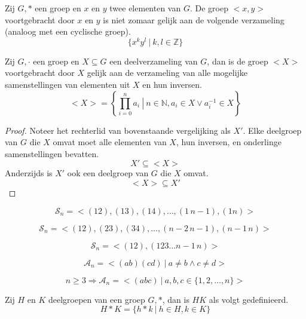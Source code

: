 \documentclass[main.tex]{subfiles}
\begin{document}
\begin{opm}
  Zij $G,*$ een groep en $x$ en $y$ twee elementen van $G$.
  De groep $<x,y>$ voortgebracht door $x$ en $y$ is niet zomaar gelijk aan de volgende verzameling (analoog met een cyclische groep).
  \[ \{ x^{k}y^{l}\ |\ k,l\in \mathbb{Z} \} \]
\end{opm}

\begin{ei}
  Zij $G,\cdot$ een groep en $X \subseteq G$ een deelverzameling van $G$, dan is de groep $<X>$ voortgebracht door $X$ gelijk aan de verzameling van alle mogelijke samenstellingen van elementen uit $X$ en hun inversen.
  \[ <X> = \left\{ \prod_{i=0}^{n}a_{i} \ \left|\ n\in \mathbb{N}, a_{i}\in X \vee a_{i}^{-1} \in X \right.\right\}\]

  \begin{proof}
    Noteer het rechterlid van bovenstaande vergelijking als $X'$.
    Elke deelgroep van $G$ die $X$ omvat moet alle elementen van $X$, hun inversen, en onderlinge samenstellingen bevatten.
    \[ X' \subseteq <X> \]
    Anderzijds is $X'$ ook een deelgroep van $G$ die $X$ omvat.
\waarom
    \[ <X> \subseteq X' \]
  \end{proof}
\end{ei}

\begin{pr}
  \[ \mathcal{S}_n = <(12),(13),(14),\dotsc, (1\, n-1), (1n)> \]
\end{pr}

\begin{pr}
  \[ \mathcal{S}_n = <(12),(23),(34),\dotsc, (n-2\, n-1), (n-1\,n)> \]
\end{pr}

\begin{pr}
  \[ \mathcal{S}_n = <(12), (123\dotsc n-1\,n)> \]
\end{pr}

\begin{pr}
  \[ \mathcal{A}_n = <(ab)(cd)\ |\ a\neq b \wedge c \neq d> \]
\end{pr}

\begin{pr}
  \[ n \ge 3 \Rightarrow \mathcal{A}_n = <(abc)\ |\ a,b,c \in \{1,2,\dotsc,n\}> \]
\end{pr}

\begin{de}
  Zij $H$ en $K$ deelgroepen van een groep $G,*$, dan is $HK$ als volgt gedefinieerd.
  \[ H*K = \{ h*k\ |\ h\in H, k\in K \} \]
\end{de}
\end{document}
